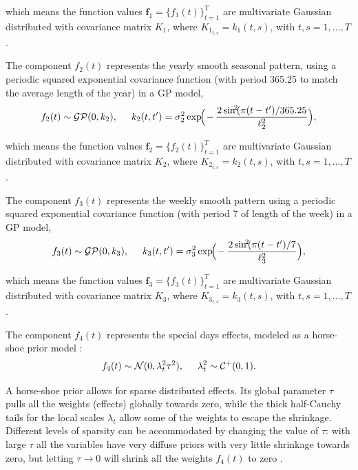 \documentclass[onecolumn,a4paper,11pt]{article}
\begin{document}
\noindent which means the function values $\bm{f}_1=\{f_1(t)\}_{t=1}^T$ are multivariate Gaussian distributed with covariance matrix $K_1$, where $K_{1_{t,s}}=k_1(t,s)$, with $t,s=1,\dots,T$.

The component $f_2(t)$ represents the yearly smooth seasonal pattern, using a periodic squared exponential covariance function (with period 365.25 to match the average length of the year) in a GP model,
%
\begin{equation*}
f_2(t) \sim \mathcal{GP}(0,k_2), \hspace{5mm} k_2(t,t') = \sigma_2^2 \exp\!\!\Big(\!-\frac{2\,\text{sin}^{\!2}\!(\pi(t-t')/365.25}{\ell_2^2}\Big), 
\end{equation*}

\noindent which means the function values $\bm{f}_2=\{f_2(t)\}_{t=1}^T$ are multivariate Gaussian distributed with covariance matrix $K_2$, where $K_{2_{t,s}}=k_2(t,s)$, with $t,s=1,\dots,T$.

The component $f_3(t)$ represents the weekly smooth pattern using a periodic squared exponential covariance function (with period 7 of length of the week) in a GP model,
%
\begin{equation*}
f_3(t) \sim \mathcal{GP}(0,k_3), \hspace{5mm} k_3(t,t') = \sigma_3^2 \exp\!\!\Big(\!-\frac{2\,\text{sin}^{\!2}\!(\pi(t-t')/7}{\ell_3^2}\Big), 
\end{equation*}

\noindent which means the function values $\bm{f}_3=\{f_3(t)\}_{t=1}^T$ are multivariate Gaussian distributed with covariance matrix $K_3$, where $K_{3_{t,s}}=k_3(t,s)$, with $t,s=1,\dots,T$.

The component $f_4(t)$ represents the special days effects, modeled as a horse-shoe prior model \citep{piironen2017sparsity}:
%
\begin{equation*}
f_4(t) \sim \mathcal{N}(0,\lambda^2_t \tau^2), \hspace{5mm} \lambda^2_t \sim \mathcal{C}^{+}(0,1).
\end{equation*}

\noindent A horse-shoe prior allows for sparse distributed effects. Its global parameter $\tau$ pulls all the weights (effects) globally towards zero, while the thick half-Cauchy tails for the local scales $\lambda_t$ allow some of the weights to escape the shrinkage. Different levels of sparsity can be accommodated by changing the value of $\tau$: with large $\tau$ all the variables have very diffuse priors with very little shrinkage towards zero, but letting $\tau \rightarrow 0$ will shrink all the weights $f_4(t)$ to zero \citep{piironen2016hyperprior}. 
\end{document}

